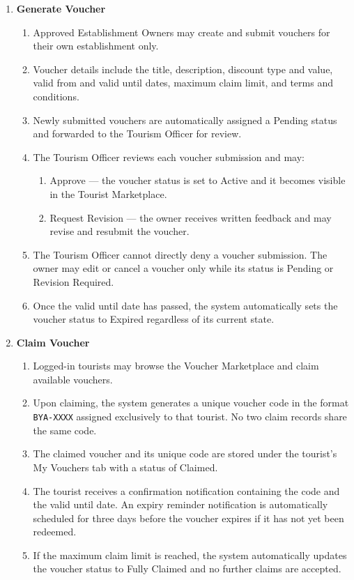 \documentclass{research}
\begin{document}
\begin{enumerate}
    \item \textbf{Generate Voucher}
    \begin{enumerate}
        \item Approved Establishment Owners may create and submit vouchers 
        for their own establishment only.
        \item Voucher details include the title, description, discount type 
        and value, valid from and valid until dates, maximum claim limit, 
        and terms and conditions.
        \item Newly submitted vouchers are automatically assigned a Pending 
        status and forwarded to the Tourism Officer for review.
        \item The Tourism Officer reviews each voucher submission and may:
        \begin{enumerate}
            \item Approve --- the voucher status is set to Active and it 
            becomes visible in the Tourist Marketplace.
            \item Request Revision --- the owner receives written feedback 
            and may revise and resubmit the voucher.
        \end{enumerate}
        \item The Tourism Officer cannot directly deny a voucher submission. 
        The owner may edit or cancel a voucher only while its status is 
        Pending or Revision Required.
        \item Once the valid until date has passed, the system automatically 
        sets the voucher status to Expired regardless of its current state.
    \end{enumerate}

    \item \textbf{Claim Voucher}
    \begin{enumerate}
        \item Logged-in tourists may browse the Voucher Marketplace and 
        claim available vouchers.
        \item Upon claiming, the system generates a unique voucher code in 
        the format \texttt{BYA-XXXX} assigned exclusively to that tourist. 
        No two claim records share the same code.
        \item The claimed voucher and its unique code are stored under the 
        tourist's My Vouchers tab with a status of Claimed.
        \item The tourist receives a confirmation notification containing 
        the code and the valid until date. An expiry reminder notification 
        is automatically scheduled for three days before the voucher expires 
        if it has not yet been redeemed.
        \item If the maximum claim limit is reached, the system automatically 
        updates the voucher status to Fully Claimed and no further claims 
        are accepted.
    \end{enumerate}


\end{enumerate}
\end{document}
